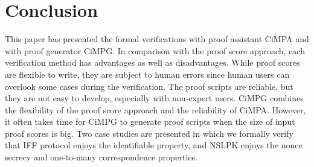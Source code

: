 \documentclass[10pt, conference, compsocconf]{IEEEtran}
\begin{document}
\section{Conclusion}
\label{sect_concl}
This paper has presented the formal verifications with proof assistant CiMPA and with proof generator CiMPG. 
In comparison with the proof score approach, each verification method has advantages as well as disadvantages. 
While proof scores are flexible to write, they are subject to human errors since human users can overlook some cases during the verification. 
The proof scripts are reliable, but they are not easy to develop, especially with non-expert users. 
CiMPG combines the flexibility of the proof score approach and the reliability of CiMPA. However, it often takes time for CiMPG to generate proof scripts when the size of input proof scores is big. 
Two case studies are presented in which we formally verify that IFF protocol enjoys the identifiable property, and NSLPK enjoys the nonce secrecy and one-to-many correspondence properties.

%
%

\end{document}
